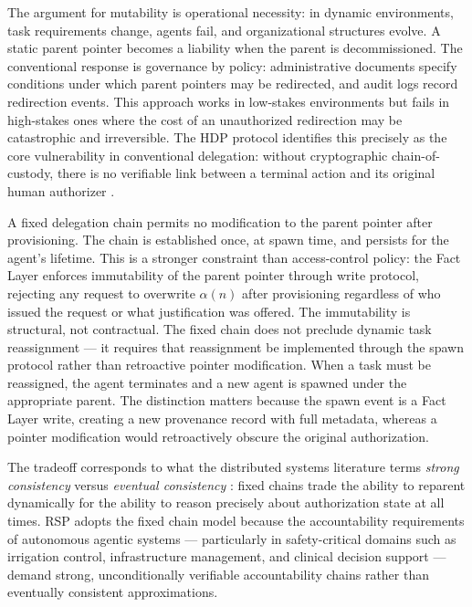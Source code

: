\documentclass[12pt]{article}
\begin{document}
The argument for mutability is operational necessity: in dynamic environments, task requirements change, agents fail, and organizational structures evolve. A static parent pointer becomes a liability when the parent is decommissioned. The conventional response is governance by policy: administrative documents specify conditions under which parent pointers may be redirected, and audit logs record redirection events. This approach works in low-stakes environments but fails in high-stakes ones where the cost of an unauthorized redirection may be catastrophic and irreversible. The HDP protocol identifies this precisely as the core vulnerability in conventional delegation: without cryptographic chain-of-custody, there is no verifiable link between a terminal action and its original human authorizer \cite{hdp-draft,hdp-draft-2}.

A fixed delegation chain permits no modification to the parent pointer after provisioning. The chain is established once, at spawn time, and persists for the agent's lifetime. This is a stronger constraint than access-control policy: the Fact Layer enforces immutability of the parent pointer through write protocol, rejecting any request to overwrite $\alpha(n)$ after provisioning regardless of who issued the request or what justification was offered. The immutability is structural, not contractual. The fixed chain does not preclude dynamic task reassignment --- it requires that reassignment be implemented through the spawn protocol rather than retroactive pointer modification. When a task must be reassigned, the agent terminates and a new agent is spawned under the appropriate parent. The distinction matters because the spawn event is a Fact Layer write, creating a new provenance record with full metadata, whereas a pointer modification would retroactively obscure the original authorization.

The tradeoff corresponds to what the distributed systems literature terms \emph{strong consistency} versus \emph{eventual consistency} \cite{vogels2009eventual}: fixed chains trade the ability to reparent dynamically for the ability to reason precisely about authorization state at all times. RSP adopts the fixed chain model because the accountability requirements of autonomous agentic systems --- particularly in safety-critical domains such as irrigation control, infrastructure management, and clinical decision support --- demand strong, unconditionally verifiable accountability chains rather than eventually consistent approximations.
\end{document}
